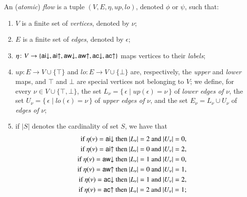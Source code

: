 \newcommand{\ppl  }{{\mathchoice{\scriptstyle+}
                                {\scriptstyle+}
                                {\scriptstyle+}
                                {\scriptscriptstyle+}}}
\newcommand{\pmi  }{{\mathchoice{\scriptstyle-}
                                {\scriptstyle-}
                                {\scriptstyle-}
                                {\scriptscriptstyle-}}}
\newcommand{\card}[1]{\mathord\vert #1\mathord\vert}
\newcommand{\up}{{\mathit up}}
\newcommand{\lo}{{\mathit lo}}
\begin{definition}
An (\emph{atomic}) \emph{flow} is a tuple $(V,E,\eta,\up,\lo)$, denoted $\phi$ or $\psi$, such that:
\begin{enumerate}
\item $V$ is a finite set of \emph{vertices}, denoted by $\nu$;
\item $E$ is a finite set of \emph{edges}, denoted by $\epsilon$;
\item $\eta\colon V\to\{\mathsf{ai}{\downarrow},\mathsf{ai}{\uparrow},\mathsf{aw}{\downarrow},\mathsf{aw}{\uparrow},\mathsf{ac}{\downarrow},\mathsf{ac}{\uparrow}\}$ maps vertices to their \emph{labels};
\item $\up\colon E\to V\cup\{\top\}$ and $\lo\colon E\to V\cup\{\bot\}$ are, respectively, the \emph{upper} and \emph{lower} maps, and $\top$ and $\bot$ are special vertices not belonging to $V$; we define, for every $\nu\in V\cup\{\top,\bot\}$, the set $L_\nu=\{\,\epsilon\mid\up(\epsilon)=\nu\,\}$ of \emph{lower edges of $\nu$}, the set $U_\nu=\{\,\epsilon\mid\lo(\epsilon)=\nu\,\}$ of \emph{upper edges of $\nu$}, and the set $E_\nu=L_\nu\cup U_\nu$ of \emph{edges of $\nu$};
\item if $\card S$ denotes the cardinality of set $S$, we have that
\begin{align*}
\mbox{if $\eta(\nu)=\aid$ then $\card{L_\nu}=2$ and $\card{U_\nu}=0$,}&\\
\mbox{if $\eta(\nu)=\aiu$ then $\card{L_\nu}=0$ and $\card{U_\nu}=2$,}&\\
\mbox{if $\eta(\nu)=\awd$ then $\card{L_\nu}=1$ and $\card{U_\nu}=0$,}&\\
\mbox{if $\eta(\nu)=\awu$ then $\card{L_\nu}=0$ and $\card{U_\nu}=1$,}&\\
\mbox{if $\eta(\nu)=\acd$ then $\card{L_\nu}=1$ and $\card{U_\nu}=2$,}&\\
\mbox{if $\eta(\nu)=\acu$ then $\card{L_\nu}=2$ and $\card{U_\nu}=1$;}&
\end{align*}

\end{enumerate}
\end{definition}
